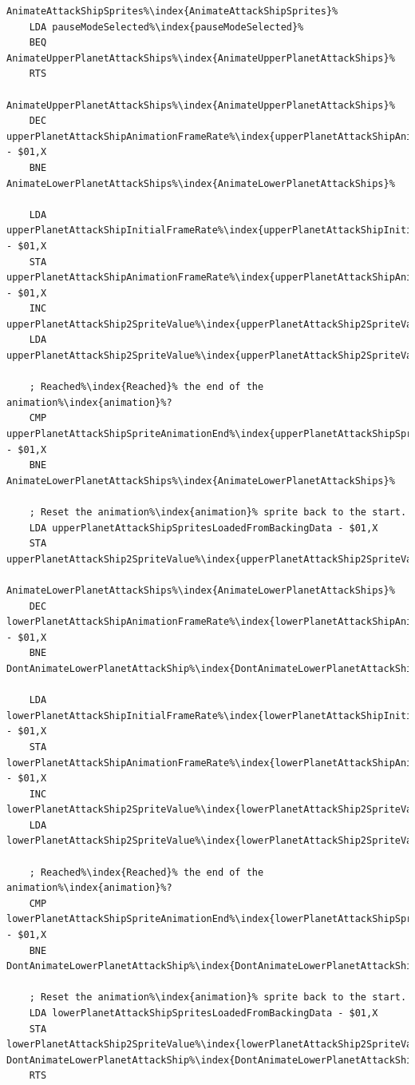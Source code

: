 \begin{lstlisting}[caption=Routine for Animating Enemy Sprites\index{Sprites}. ,escapechar=\%]
AnimateAttackShipSprites%\index{AnimateAttackShipSprites}%
    LDA pauseModeSelected%\index{pauseModeSelected}%
    BEQ AnimateUpperPlanetAttackShips%\index{AnimateUpperPlanetAttackShips}%
    RTS

AnimateUpperPlanetAttackShips%\index{AnimateUpperPlanetAttackShips}%   
    DEC upperPlanetAttackShipAnimationFrameRate%\index{upperPlanetAttackShipAnimationFrameRate}% - $01,X
    BNE AnimateLowerPlanetAttackShips%\index{AnimateLowerPlanetAttackShips}%

    LDA upperPlanetAttackShipInitialFrameRate%\index{upperPlanetAttackShipInitialFrameRate}% - $01,X
    STA upperPlanetAttackShipAnimationFrameRate%\index{upperPlanetAttackShipAnimationFrameRate}% - $01,X
    INC upperPlanetAttackShip2SpriteValue%\index{upperPlanetAttackShip2SpriteValue}%,X
    LDA upperPlanetAttackShip2SpriteValue%\index{upperPlanetAttackShip2SpriteValue}%,X

    ; Reached%\index{Reached}% the end of the animation%\index{animation}%?
    CMP upperPlanetAttackShipSpriteAnimationEnd%\index{upperPlanetAttackShipSpriteAnimationEnd}% - $01,X
    BNE AnimateLowerPlanetAttackShips%\index{AnimateLowerPlanetAttackShips}%

    ; Reset the animation%\index{animation}% sprite back to the start.
    LDA upperPlanetAttackShipSpritesLoadedFromBackingData - $01,X
    STA upperPlanetAttackShip2SpriteValue%\index{upperPlanetAttackShip2SpriteValue}%,X

AnimateLowerPlanetAttackShips%\index{AnimateLowerPlanetAttackShips}%   
    DEC lowerPlanetAttackShipAnimationFrameRate%\index{lowerPlanetAttackShipAnimationFrameRate}% - $01,X
    BNE DontAnimateLowerPlanetAttackShip%\index{DontAnimateLowerPlanetAttackShip}%

    LDA lowerPlanetAttackShipInitialFrameRate%\index{lowerPlanetAttackShipInitialFrameRate}% - $01,X
    STA lowerPlanetAttackShipAnimationFrameRate%\index{lowerPlanetAttackShipAnimationFrameRate}% - $01,X
    INC lowerPlanetAttackShip2SpriteValue%\index{lowerPlanetAttackShip2SpriteValue}%,X
    LDA lowerPlanetAttackShip2SpriteValue%\index{lowerPlanetAttackShip2SpriteValue}%,X

    ; Reached%\index{Reached}% the end of the animation%\index{animation}%?
    CMP lowerPlanetAttackShipSpriteAnimationEnd%\index{lowerPlanetAttackShipSpriteAnimationEnd}% - $01,X
    BNE DontAnimateLowerPlanetAttackShip%\index{DontAnimateLowerPlanetAttackShip}%

    ; Reset the animation%\index{animation}% sprite back to the start.
    LDA lowerPlanetAttackShipSpritesLoadedFromBackingData - $01,X
    STA lowerPlanetAttackShip2SpriteValue%\index{lowerPlanetAttackShip2SpriteValue}%,X
DontAnimateLowerPlanetAttackShip%\index{DontAnimateLowerPlanetAttackShip}%   
    RTS
\end{lstlisting}
 
